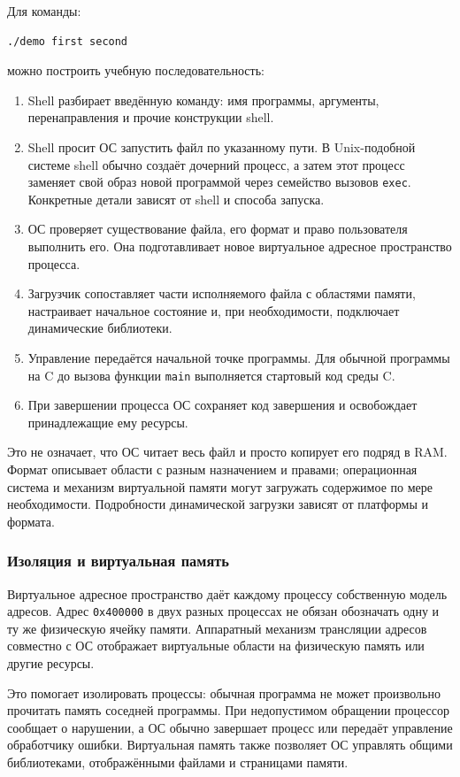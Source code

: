 Для команды:
\begin{lstlisting}
./demo first second
\end{lstlisting}
можно построить учебную последовательность:
\begin{enumerate}
  \item Shell разбирает введённую команду: имя программы, аргументы,
        перенаправления и прочие конструкции shell.
  \item Shell просит ОС запустить файл по указанному пути. В Unix-подобной
        системе shell обычно создаёт дочерний процесс, а затем этот процесс
        заменяет свой образ новой программой через семейство вызовов
        \texttt{exec}. Конкретные детали зависят от shell и способа запуска.
  \item ОС проверяет существование файла, его формат и право пользователя
        выполнить его. Она подготавливает новое виртуальное адресное
        пространство процесса.
  \item Загрузчик сопоставляет части исполняемого файла с областями памяти,
        настраивает начальное состояние и, при необходимости, подключает
        динамические библиотеки.
  \item Управление передаётся начальной точке программы. Для обычной программы
        на C до вызова функции \texttt{main} выполняется стартовый код среды C.
  \item При завершении процесса ОС сохраняет код завершения и освобождает
        принадлежащие ему ресурсы.
\end{enumerate}

Это не означает, что ОС читает весь файл и просто копирует его подряд в RAM.
Формат описывает области с разным назначением и правами; операционная система
и механизм виртуальной памяти могут загружать содержимое по мере необходимости.
Подробности динамической загрузки зависят от платформы и формата.

\subsubsection*{Изоляция и виртуальная память}

Виртуальное адресное пространство даёт каждому процессу собственную модель
адресов. Адрес \texttt{0x400000} в двух разных процессах не обязан обозначать
одну и ту же физическую ячейку памяти. Аппаратный механизм трансляции адресов
совместно с ОС отображает виртуальные области на физическую память или другие
ресурсы.

Это помогает изолировать процессы: обычная программа не может произвольно
прочитать память соседней программы. При недопустимом обращении процессор
сообщает о нарушении, а ОС обычно завершает процесс или передаёт управление
обработчику ошибки. Виртуальная память также позволяет ОС управлять общими
библиотеками, отображёнными файлами и страницами памяти.

